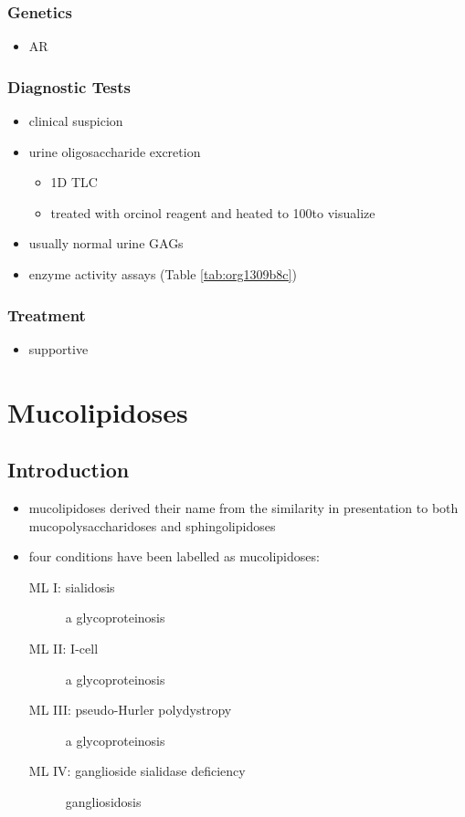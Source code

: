 \documentclass[12pt]{scrartcl}
\begin{document}
\subsubsection{Genetics}
\label{sec:org1d7efbf}
\begin{itemize}
\item AR
\end{itemize}
\subsubsection{Diagnostic Tests}
\label{sec:org6a7644f}
\begin{itemize}
\item clinical suspicion
\item urine oligosaccharide excretion
\begin{itemize}
\item 1D TLC
\item treated with orcinol reagent and heated to 100\degreeC to visualize
\end{itemize}
\item usually normal urine GAGs
\item enzyme activity assays (Table \ref{tab:org1309b8c})
\end{itemize}

\subsubsection{Treatment}
\label{sec:orga601541}
\begin{itemize}
\item supportive
\end{itemize}
\section{Mucolipidoses}
\label{sec:orgf6f15e0}
\subsection{Introduction}
\label{sec:orgd9ecf58}
\begin{itemize}
\item mucolipidoses derived their name from the similarity in
presentation to both mucopolysaccharidoses and sphingolipidoses
\item four conditions have been labelled as mucolipidoses:
\begin{description}
\item[{ML I: sialidosis}] a glycoproteinosis
\item[{ML II: I-cell}] a glycoproteinosis
\item[{ML III: pseudo-Hurler polydystropy}] a glycoproteinosis
\item[{ML IV: ganglioside sialidase deficiency}] gangliosidosis
\end{description}
\end{itemize}
\end{document}
